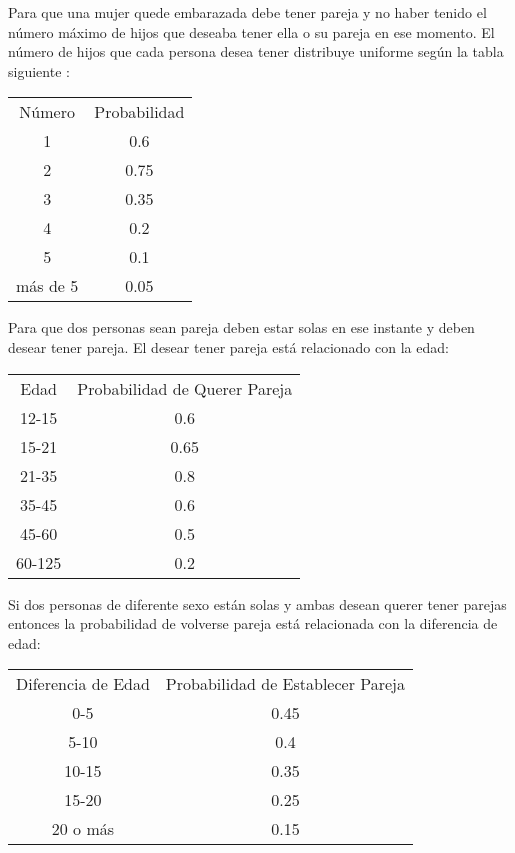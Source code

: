 \documentclass[12pt]{article}
\begin{document}
Para que una mujer quede embarazada debe tener pareja y no haber tenido
el n\'umero m\'aximo de hijos que deseaba tener ella o su pareja en ese momento.
El n\'umero de hijos que cada persona desea tener distribuye uniforme seg\'un la
tabla siguiente :


\begin{table}[htbp]
	\begin{center}
		\begin{tabular}{c c }
			
			N\'umero&Probabilidad \\
			1 &0.6		\\
			2 &0.75  	\\
			3&0.35   \\
			4&0.2  \\
			5 &0.1  \\
			m\'as de 5& 0.05  \\
		\end{tabular}
	\end{center}
\end{table}
\newpage
Para que dos personas sean pareja deben estar solas en ese instante y deben
desear tener pareja. El desear tener pareja est\'a relacionado con la edad:
\begin{table}[htbp]
	\begin{center}
		\begin{tabular}{c c }
			
			Edad&Probabilidad de Querer Pareja \\
			12-15 &0.6		\\
			15-21 &0.65  	\\
			21-35&0.8   \\
			35-45&0.6  \\
			45-60 &0.5  \\
			60-125& 0.2  \\
		\end{tabular}
	\end{center}
\end{table}

Si dos personas de diferente sexo est\'an solas y ambas desean querer tener
parejas entonces la probabilidad de volverse pareja est\'a relacionada con la diferencia de edad:
\begin{table}[htbp]
	\begin{center}
		\begin{tabular}{c c }
			
			Diferencia de Edad&Probabilidad de Establecer Pareja \\
			0-5 &0.45		\\
			5-10 &0.4 	\\
			10-15&0.35   \\
			15-20&0.25  \\
			20 o m\'as &0.15  \\
		\end{tabular}
	\end{center}
\end{table}
\end{document}
